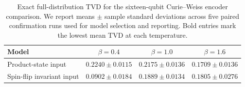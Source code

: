 \begin{table}[!htbp]
\centering
\small
\renewcommand{\arraystretch}{1.12}
\setlength{\tabcolsep}{3pt}
\caption{Exact full-distribution TVD for the sixteen-qubit Curie--Weiss encoder comparison. We report means $\pm$ sample standard deviations across five paired confirmation runs used for model selection and reporting. Bold entries mark the lowest mean TVD at each temperature.}
\label{tab:cw_symmetry_metrics}
\begin{tabular}{lccc}
\toprule
Model & $\beta=0.4$ & $\beta=1.0$ & $\beta=1.6$ \\
\midrule
Product-state input & $0.2240\pm0.0115$ & $0.2175\pm0.0136$ & $\boldsymbol{0.1709\pm0.0136}$ \\
Spin-flip invariant input & $\boldsymbol{0.0902\pm0.0184}$ & $\boldsymbol{0.1889\pm0.0134}$ & $0.1805\pm0.0276$ \\
\bottomrule
\end{tabular}
\end{table}
